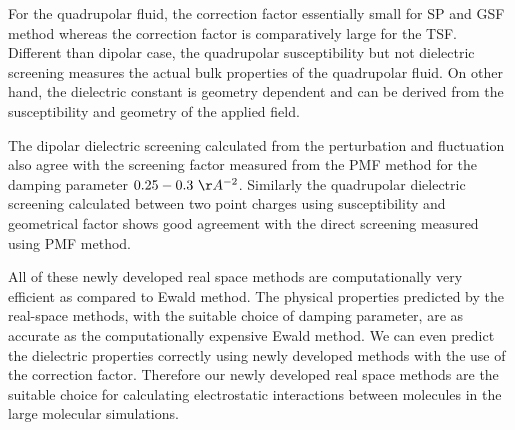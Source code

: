 For the quadrupolar fluid, the correction factor essentially small for SP and GSF method whereas the correction factor is comparatively large for the TSF. Different than dipolar case, the quadrupolar susceptibility but not dielectric screening measures the actual bulk properties of the quadrupolar fluid. On other hand, the dielectric constant is geometry dependent and can be derived from the susceptibility and geometry of the applied field. 

The dipolar dielectric screening calculated from the perturbation and fluctuation also agree with the screening factor measured from the PMF method for the damping parameter $0.25 - 0.3~\AA^{-2}$. Similarly the quadrupolar dielectric screening calculated between two point charges using susceptibility and geometrical factor shows good agreement with the direct screening measured using PMF method.

All of these newly developed real space methods are computationally very efficient as compared to Ewald method. The physical properties predicted by the real-space methods, with the suitable choice of damping parameter, are as accurate as the computationally expensive Ewald method. We can even predict the dielectric properties correctly using newly developed methods with the use of the correction factor. Therefore our newly developed real space methods are the suitable choice for calculating electrostatic interactions between molecules in the large molecular simulations.         
    

  



%
% 
% 